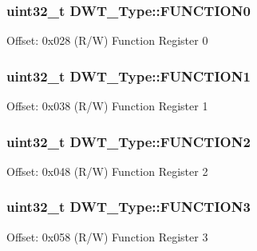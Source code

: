 \subsubsection[{\texorpdfstring{F\+U\+N\+C\+T\+I\+O\+N0}{FUNCTION0}}]{ uint32\+\_\+t D\+W\+T\+\_\+\+Type\+::\+F\+U\+N\+C\+T\+I\+O\+N0}\hypertarget{struct_d_w_t___type_a5fbd9947d110cc168941f6acadc4a729}{}\label{struct_d_w_t___type_a5fbd9947d110cc168941f6acadc4a729}
Offset\+: 0x028 (R/W) Function Register 0 
\subsubsection[{\texorpdfstring{F\+U\+N\+C\+T\+I\+O\+N1}{FUNCTION1}}]{ uint32\+\_\+t D\+W\+T\+\_\+\+Type\+::\+F\+U\+N\+C\+T\+I\+O\+N1}\hypertarget{struct_d_w_t___type_a3345a33476ee58e165447a3212e6d747}{}\label{struct_d_w_t___type_a3345a33476ee58e165447a3212e6d747}
Offset\+: 0x038 (R/W) Function Register 1 
\subsubsection[{\texorpdfstring{F\+U\+N\+C\+T\+I\+O\+N2}{FUNCTION2}}]{ uint32\+\_\+t D\+W\+T\+\_\+\+Type\+::\+F\+U\+N\+C\+T\+I\+O\+N2}\hypertarget{struct_d_w_t___type_acba1654190641a3617fcc558b5e3f87b}{}\label{struct_d_w_t___type_acba1654190641a3617fcc558b5e3f87b}
Offset\+: 0x048 (R/W) Function Register 2 
\subsubsection[{\texorpdfstring{F\+U\+N\+C\+T\+I\+O\+N3}{FUNCTION3}}]{ uint32\+\_\+t D\+W\+T\+\_\+\+Type\+::\+F\+U\+N\+C\+T\+I\+O\+N3}\hypertarget{struct_d_w_t___type_a80bd242fc05ca80f9db681ce4d82e890}{}\label{struct_d_w_t___type_a80bd242fc05ca80f9db681ce4d82e890}
Offset\+: 0x058 (R/W) Function Register 3 
